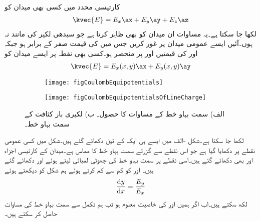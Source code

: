 کارتیسی محدد میں کسی بھی میدان کو
\begin{align*}
\kvec{E}=E_x\ax+E_y\ay+E_z\az
\end{align*}
لکھا جا سکتا ہے۔یہ مساوات ان میدان کو بھی ظاہر کرتا ہے جو سیدھی لکیر کی مانند نہ ہوں۔آئیں ایسے عمومی میدان پر غور کریں جس میں  کی قیمت صفر کے برابر ہو جبکہ  اور  کی قیمتیں  اور  پر منحصر ہو۔کسی بھی نقطہ  پر ایسے میدان کو
\begin{align}\label{مساوات_کولمب_عمومی_مارتیسی_میدان}
\kvec{E}=E_x(x,y)\ax+E_y(x,y)\ay
\end{align}
%
\begin{figure}
\centering
\begin{subfigure}{0.5\textwidth}
\centering
\texttt{[image: figCoulombEquipotentials]}
\end{subfigure}%
%
\begin{subfigure}{0.5\textwidth}
\centering
\texttt{[image: figCoulombEquipotentialsOfLineCharge]}
\end{subfigure}%
\caption{الف) سمت بہاو خط کے مساوات کا حصول۔ ب) لکیری بار کثافت کے سمت بہاو خط۔}
\label{شکل_کولمب_سمت_بہاو_خط}
\end{figure}
لکھا  جا سکتا ہے۔شکل -الف میں ایسے ہی ایک  کے تین  دکھائے گئے ہیں۔شکل میں کسی عمومی نقطے پر  دکھایا گیا ہے جو اس نقطے سے  گزرتے سمت بہاو خط کا مماس ہے۔میدان کے کارتیسی اجزاء  اور  بھی دکھائے گئے ہیں۔اسی نقطے پر سمت بہاو خط کی چھوٹی لمبائی لیتے ہوئے  اور  دکھائے گئے ہیں۔ اور   کو کم سے کم کرتے ہوئے ہم شکل کو دیکھتے ہوئے
\begin{align}\label{مساوات_کولمب_سمت_بہاو_کارتیسی}
\frac{\dif y}{\dif x}=\frac{E_y}{E_x}
\end{align}
لکھ سکتے ہیں۔اب اگر ہمیں  اور  کی خاصیت معلوم ہو تب ہم تکمل سے سمت بہاو خط کی مساوات حاصل کر سکتے ہیں۔

